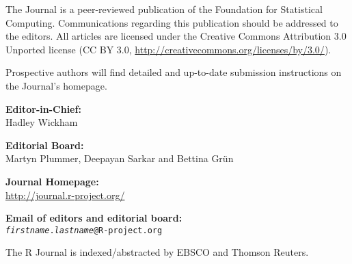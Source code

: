 \documentclass[a4paper]{report}
\begin{document}
\sectionhead{}

\titlepage

\vspace*{1in}
\begin{center}
\begin{minipage}{0.65\textwidth}
    \begin{center}
    The \R{} Journal is a peer-reviewed publication of
    the \R{} Foundation for Statistical Computing. Communications
    regarding this publication should be addressed to the editors. All
    articles are licensed under the Creative Commons Attribution 3.0 Unported
    license (CC BY 3.0, \url{http://creativecommons.org/licenses/by/3.0/}).
    \bigskip

    Prospective authors will find detailed and up-to-date submission
    instructions on the Journal's homepage.

    \bigskip
      \textbf{Editor-in-Chief:}\\
      Hadley Wickham

    \bigskip
      \textbf{Editorial Board:}\\
      Martyn Plummer, Deepayan Sarkar and Bettina Gr\"un

    \bigskip
    \textbf{\R{} Journal Homepage:}\\
    \url{http://journal.r-project.org/}
    
    \bigskip
    \textbf{Email of editors and editorial board:}\\
    \texttt{\textit{firstname}.\textit{lastname}@R-project.org}

    \bigskip The R Journal is indexed/abstracted by EBSCO and Thomson Reuters.
      
  \end{center}
    
  \end{minipage}
\end{center}

\newpage

\begin{article}
  
\end{article}
\cleardoublepage

\end{document}
